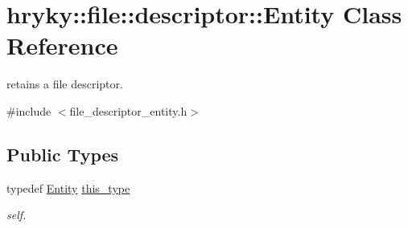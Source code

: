 \hypertarget{classhryky_1_1file_1_1descriptor_1_1_entity}{\section{hryky\-:\-:file\-:\-:descriptor\-:\-:Entity Class Reference}
\label{classhryky_1_1file_1_1descriptor_1_1_entity}
}


retains a file descriptor.  




{\ttfamily \#include $<$file\-\_\-descriptor\-\_\-entity.\-h$>$}

\subsection*{Public Types}
\begin{DoxyCompactItemize}
\item 
\hypertarget{classhryky_1_1file_1_1descriptor_1_1_entity_aeddd6b16ed286888bba1c419eee51d6c}{typedef \hyperlink{classhryky_1_1file_1_1descriptor_1_1_entity}{Entity} \hyperlink{classhryky_1_1file_1_1descriptor_1_1_entity_aeddd6b16ed286888bba1c419eee51d6c}{this\-\_\-type}}\label{classhryky_1_1file_1_1descriptor_1_1_entity_aeddd6b16ed286888bba1c419eee51d6c}

\begin{DoxyCompactList}\small\item\em self. \end{DoxyCompactList}\end{DoxyCompactItemize}
